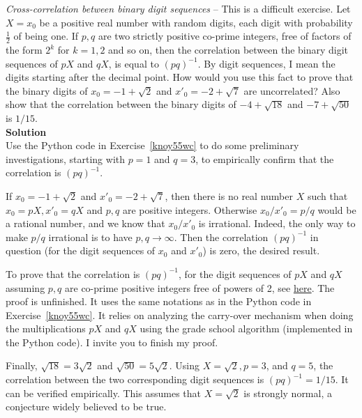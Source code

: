 \documentclass[oneside,10pt]{book}
\begin{document}
\begin{Exercise}\label{pqcorr} {\em Cross-correlation between binary digit sequences} -- This is a difficult exercise. Let
 $X=x_0$ be a positive real number with random digits, each digit with probability $\frac{1}{2}$ of being one. If $p, q$ are two strictly positive co-prime integers, free of factors of the form $2^k$ for $k=1,2$ and so on, then the correlation between the binary digit sequences of $pX$ and $qX$, is equal to $(pq)^{-1}$. By digit sequences, I mean the digits starting after the decimal point.
How would you use this fact to prove that the binary digits of $x_0= -1+\sqrt{2}$ and $x'_0=-2 +\sqrt{7}$ are
 uncorrelated? Also show that the correlation between the binary digits of $-4 + \sqrt{18}$ and $-7+\sqrt{50}$ is $1/15$.
\vspace{1ex} \\
{\bf Solution} \\
Use the Python code in Exercise~\ref{knoy55wc} to do some preliminary investigations, starting with $p=1$ and $q=3$, to empirically confirm that the correlation is $(pq)^{-1}$.

If $x_0= -1+\sqrt{2}$ and $x'_0=-2 +\sqrt{7}$, then there is no real number $X$ such that
 $x_0=pX, x'_0=qX$ and $p, q$ are positive integers. Otherwise $x_0/x'_0 = p/q$ would be a rational number, and we know
 that $x_0/x'_0$ is irrational. Indeed, the only way to make $p/q$ irrational is to have $p, q\rightarrow\infty$. Then the correlation
  $(pq)^{-1}$ in question (for the digit sequences of $x_0$ and $x'_0$) is zero, the desired result.

To prove that the correlation is $(pq)^{-1}$, for the digit sequences of $pX$ and $qX$ assuming $p,q$ are co-prime positive integers free of powers of 2,
 see \href{https://stats.stackexchange.com/questions/450922/cross-correlations-in-digit-distributions}{here}. The proof is unfinished. It uses the same notations as in the Python code in Exercise~\ref{knoy55wc}. It relies on analyzing the carry-over mechanism when doing the multiplications $pX$ and $qX$ using the grade school algorithm (implemented in the Python code). I invite you to finish my proof.

Finally, $\sqrt{18} = 3\sqrt{2}$ and $\sqrt{50} = 5\sqrt{2}$. Using $X=\sqrt{2}, p=3$, and $q=5$, the correlation between the two corresponding digit sequences is $(pq)^{-1}= 1/15$. It can be verified empirically. This assumes that $X=\sqrt{2}$ is \textcolor{index}{strongly normal}, a conjecture widely believed to be true.
\end{Exercise}
\end{document}
